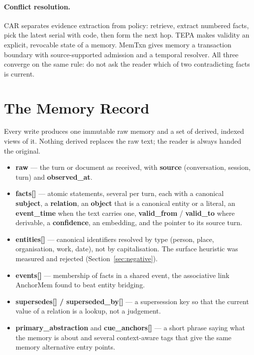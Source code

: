 \documentclass[11pt]{article}
\begin{document}
\paragraph{Conflict resolution.} CAR \cite{car} separates evidence
extraction from policy: retrieve, extract numbered facts, pick the latest
serial with code, then form the next hop. TEPA \cite{tepa} makes validity an
explicit, revocable state of a memory. MemTxn \cite{memtxn} gives memory a
transaction boundary with source-supported admission and a temporal
resolver. All three converge on the same rule: do not ask the reader which of
two contradicting facts is current.

\section{The Memory Record}
\label{sec:write}

Every write produces one immutable raw memory and a set of derived,
indexed views of it. Nothing derived replaces the raw text; the reader is
always handed the original.

\begin{itemize}
  \item \textbf{raw} --- the turn or document as received, with \textbf{source}
        (conversation, session, turn) and \textbf{observed\_at}.
  \item \textbf{facts[]} --- atomic statements, several per turn, each with a
        canonical \textbf{subject}, a \textbf{relation}, an \textbf{object}
        that is a canonical entity or a literal, an \textbf{event\_time} when
        the text carries one, \textbf{valid\_from} / \textbf{valid\_to} where
        derivable, a \textbf{confidence}, an embedding, and the pointer to
        its source turn.
  \item \textbf{entities[]} --- canonical identifiers resolved by type
        (person, place, organisation, work, date), not by capitalisation. The
        surface heuristic was measured and rejected
        (Section~\ref{sec:negative}).
  \item \textbf{events[]} --- membership of facts in a shared event, the
        associative link AnchorMem found to beat entity bridging.
  \item \textbf{supersedes[] / superseded\_by[]} --- a supersession key so
        that the current value of a relation is a lookup, not a judgement.
  \item \textbf{primary\_abstraction} and \textbf{cue\_anchors[]} --- a short
        phrase saying what the memory is about and several context-aware tags
        that give the same memory alternative entry points.
\end{itemize}
\end{document}
